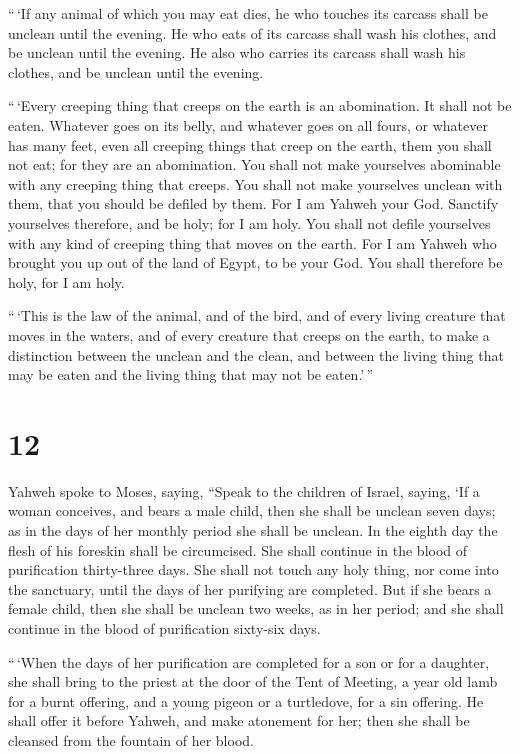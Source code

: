  ``\,`If any animal of which you may eat dies, he who
touches its carcass shall be unclean until the evening.  He
who eats of its carcass shall wash his clothes, and be unclean until the
evening. He also who carries its carcass shall wash his clothes, and be
unclean until the evening.

 ``\,`Every creeping thing that creeps on the earth is an
abomination. It shall not be eaten.  Whatever goes on its
belly, and whatever goes on all fours, or whatever has many feet, even
all creeping things that creep on the earth, them you shall not eat; for
they are an abomination.  You shall not make yourselves
abominable with any creeping thing that creeps. You shall not make
yourselves unclean with them, that you should be defiled by them.
 For I am Yahweh your God. Sanctify yourselves therefore,
and be holy; for I am holy. You shall not defile yourselves with any
kind of creeping thing that moves on the earth.  For I am
Yahweh who brought you up out of the land of Egypt, to be your God. You
shall therefore be holy, for I am holy.

 ``\,`This is the law of the animal, and of the bird, and
of every living creature that moves in the waters, and of every creature
that creeps on the earth,  to make a distinction between
the unclean and the clean, and between the living thing that may be
eaten and the living thing that may not be eaten.'\,''

\hypertarget{section-11}{%
\section{12}\label{section-11}}

 Yahweh spoke to Moses, saying,  ``Speak to the
children of Israel, saying, `If a woman conceives, and bears a male
child, then she shall be unclean seven days; as in the days of her
monthly period she shall be unclean.  In the eighth day the
flesh of his foreskin shall be circumcised.  She shall
continue in the blood of purification thirty-three days. She shall not
touch any holy thing, nor come into the sanctuary, until the days of her
purifying are completed.  But if she bears a female child,
then she shall be unclean two weeks, as in her period; and she shall
continue in the blood of purification sixty-six days.

 ``\,`When the days of her purification are completed for a
son or for a daughter, she shall bring to the priest at the door of the
Tent of Meeting, a year old lamb for a burnt offering, and a young
pigeon or a turtledove, for a sin offering.  He shall offer
it before Yahweh, and make atonement for her; then she shall be cleansed
from the fountain of her blood.

